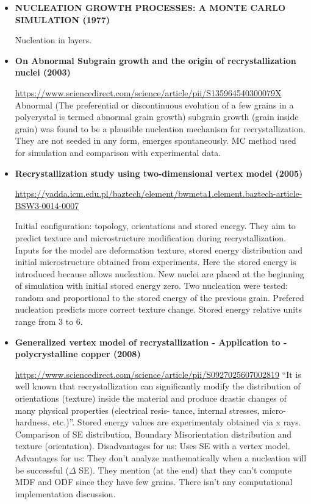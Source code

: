 \begin{itemize}
    \item 
\textbf{NUCLEATION GROWTH PROCESSES: A MONTE CARLO SIMULATION (1977)}

Nucleation in layers.

\item \textbf{On Abnormal Subgrain growth and the origin of recrystallization nuclei (2003)}

\url{https://www.sciencedirect.com/science/article/pii/S135964540300079X}
Abnormal (The preferential or discontinuous evolution of a few grains in a polycrystal is termed abnormal grain growth) subgrain growth (grain inside grain) was found to be a plausible nucleation mechanism for recrystallization. They are not seeded in any form, emerges spontaneously. MC method used for simulation and comparison with experimental data.

\item \textbf{Recrystallization study using two-dimensional vertex model (2005)}

\url{https://yadda.icm.edu.pl/baztech/element/bwmeta1.element.baztech-article-BSW3-0014-0007}

Initial configuration: topology, orientations and stored energy. They aim to predict texture and microstructure modification during recrystallization. Inputs for the model are deformation texture, stored energy distribution and initial microstructure obtained from experiments.
Here the stored energy is introduced because allows nucleation. New nuclei are placed at the beginning of simulation with initial stored energy zero. Two nucleation were tested: random and proportional to the stored energy of the previous grain. Prefered nucleation predicts more correct texture change. Stored energy relative units range from 3 to 6.

\item \textbf{Generalized vertex model of recrystallization - Application to -polycrystalline copper (2008)}

\url{https://www.sciencedirect.com/science/article/pii/S0927025607002819}
“It is well known that recrystallization can significantly modify the distribution of orientations (texture) inside the material and produce drastic changes of many physical properties (electrical resis- tance, internal stresses, micro-hardness, etc.)”. Stored energy values are experimentaly obtained via x rays. Comparison of SE distribution, Boundary Misorientation distribution and texture (orientation).
Disadvantages for us: Uses SE with a vertex model.
Advantages for us: They don’t analyze mathematically when a nucleation will be successful ($\Delta$ SE). They mention (at the end) that they can’t compute MDF and ODF since they have few grains. There isn’t any computational implementation discussion.


\end{itemize}
